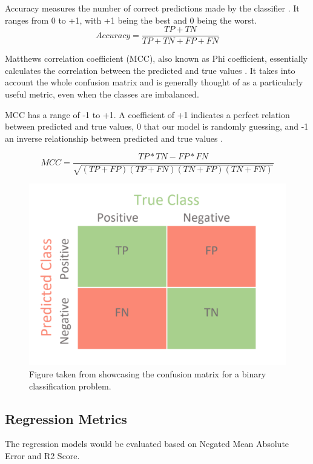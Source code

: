Accuracy measures the number of correct predictions made by the classifier \citep{Accuracy}. It ranges from 0 to +1, with +1 being the best and 0 being the worst.
$$Accuracy = \frac{TP + TN}{TP + TN + FP + FN} $$

Matthews correlation coefficient (MCC), also known as Phi coefficient, essentially calculates the correlation between the predicted and true values \citep{MCC}. It takes into account the whole confusion matrix and is generally thought of as a particularly useful metric, even when the classes are imbalanced.

MCC has a range of -1 to +1. A coefficient of +1 indicates a perfect relation between predicted and true values, 0 that our model is randomly guessing, and -1 an inverse relationship between predicted and true values \citep{MCC2}.

$$MCC = \frac{TP*TN - FP*FN}{\sqrt{(TP+FP)(TP+FN)(TN+FP)(TN+FN)}}$$

\newpage

\begin{figure}[!htb]
    \centering
    \includegraphics[width=0.8\linewidth]{images/TDS_Confusion_Matrix.pdf}    

    \caption{Figure taken from \citet{Confusion_Matrix} showcasing the confusion matrix for a binary classification problem.}

    \label{fig:Confusion_Matrix} 
\end{figure}

\subsection{Regression Metrics}

The regression models would be evaluated based on Negated Mean Absolute Error and R2 Score.

